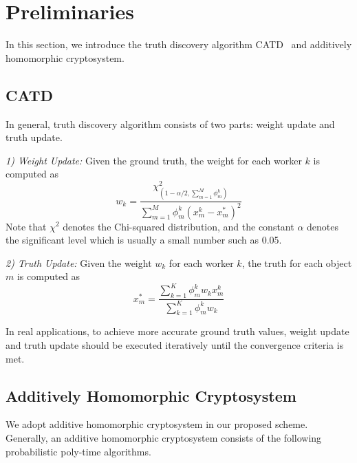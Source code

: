 \documentclass[conference]{IEEEtran}
\begin{document}
\section{Preliminaries}\label{sec4}

In this section, we introduce the truth discovery algorithm CATD~\cite{li_confidence-aware_2014} and additively homomorphic cryptosystem.


\subsection{CATD}

In general, truth discovery algorithm consists of two parts: weight update and truth update.

\textit{1) Weight Update:} Given the ground truth, the weight for each worker $k$ is computed as
\begin{equation}
w_k = \frac{\chi^2_{(1-\alpha/2,\sum_{m=1}^M \phi_m^k)}}{\sum_{m=1}^M \phi_m^k(x_m^k - x_m^*)^2}
\end{equation}
Note that $\chi^2$ denotes the Chi-squared distribution, and the constant $\alpha$ denotes the significant level which is usually a small number such as 0.05.

\textit{2) Truth Update:} Given the weight $w_k$ for each worker $k$, the truth for each object $m$ is computed as
\begin{equation}
x_m^* = \frac{\sum_{k=1}^K \phi_m^k w_k x_m^k}{\sum_{k=1}^K \phi_m^k w_k }
\end{equation}

In real applications, to achieve more accurate ground truth values, weight update and truth update should be executed iteratively until the convergence criteria is met.

\subsection{Additively Homomorphic Cryptosystem}\label{sec4-b}

We adopt additive homomorphic cryptosystem in our proposed scheme.
Generally, an additive homomorphic cryptosystem consists of the following probabilistic poly-time algorithms.
\end{document}
